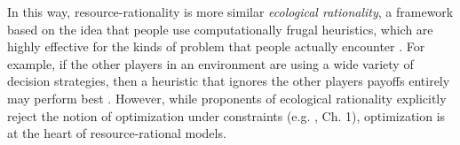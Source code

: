 In this way, resource-rationality is more similar \emph{ecological rationality}, a framework based on the idea that people use computationally frugal heuristics, which are highly effective for the kinds of problem that people actually encounter \citep{gigerenzer1999simple,goldstein2002models,todd2012ecological}. For example, if the other players in an environment are using a wide variety of decision strategies, then a heuristic that ignores the other players payoffs entirely may perform best \citep{spiliopoulos2020map}. However, while proponents of ecological rationality explicitly reject the notion of optimization under constraints (e.g. \citealp{gigerenzer1999simple}, Ch. 1), optimization is at the heart of resource-rational models.













